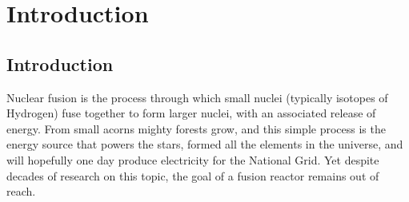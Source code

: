 

\chapter{\label{ch:intro}Introduction} 

\minitoc

\section{Introduction}
Nuclear fusion is the process through which small nuclei (typically isotopes of Hydrogen) fuse together to form larger nuclei, with an associated release of energy. From small acorns mighty forests grow, and this simple process is the energy source that powers the stars, formed all the elements in the universe, and will hopefully one day produce electricity for the National Grid. Yet despite decades of research on this topic, the goal of a fusion reactor remains out of reach.

